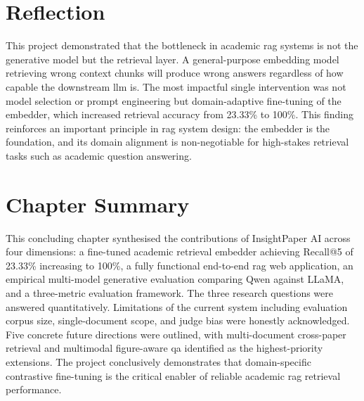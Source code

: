 \section{Reflection}

This project demonstrated that the bottleneck in academic \gls{rag} systems is not the generative model but the retrieval layer. A general-purpose embedding model retrieving wrong context chunks will produce wrong answers regardless of how capable the downstream \gls{llm} is. The most impactful single intervention was not model selection or prompt engineering but domain-adaptive fine-tuning of the embedder, which increased retrieval accuracy from 23.33\% to 100\%. This finding reinforces an important principle in \gls{rag} system design: the embedder is the foundation, and its domain alignment is non-negotiable for high-stakes retrieval tasks such as academic question answering.

\section{Chapter Summary}

This concluding chapter synthesised the contributions of InsightPaper AI across four dimensions: a fine-tuned academic retrieval embedder achieving Recall@5 of 23.33\% increasing to 100\%, a fully functional end-to-end \gls{rag} web application, an empirical multi-model generative evaluation comparing Qwen against LLaMA, and a three-metric evaluation framework. The three research questions were answered quantitatively. Limitations of the current system including evaluation corpus size, single-document scope, and judge bias were honestly acknowledged. Five concrete future directions were outlined, with multi-document cross-paper retrieval and multimodal figure-aware \gls{qa} identified as the highest-priority extensions. The project conclusively demonstrates that domain-specific contrastive fine-tuning is the critical enabler of reliable academic \gls{rag} retrieval performance.
